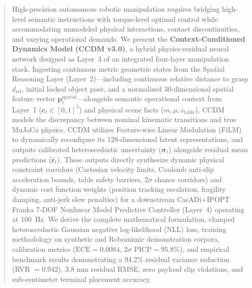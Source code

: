 \documentclass[10pt,a4paper]{article}
\begin{document}
\begin{abstract}
High-precision autonomous robotic manipulation requires bridging high-level semantic instructions with torque-level optimal control while accommodating unmodeled physical interactions, contact discontinuities, and varying operational demands. We present the \textbf{Context-Conditioned Dynamics Model (CCDM v3.0)}, a hybrid physics-residual neural network designed as Layer~3 of an integrated four-layer manipulation stack. Ingesting continuous metric geometric states from the Spatial Reasoning Layer (Layer~2)---including continuous relative distance to grasp $d_{\mathrm{rel}}$, initial locked object pose, and a normalized 30-dimensional spatial feature vector $\mathbf{p}_t^{\mathrm{spatial}}$---alongside semantic operational context from Layer~1 ($\mathbf{c}_t \in [0, 1]^5$) and physical scene facts ($m, \mu, z_{\mathrm{table}}$), CCDM models the discrepancy between nominal kinematic transitions and true MuJoCo physics. CCDM utilizes Feature-wise Linear Modulation (FiLM) to dynamically reconfigure its 128-dimensional latent representations, and outputs calibrated heteroscedastic uncertainty ($\bm{\sigma}_t$) alongside residual mean predictions ($\hat{\mathbf{r}}_t$). These outputs directly synthesize dynamic physical constraint corridors (Cartesian velocity limits, Coulomb anti-slip acceleration bounds, table safety barriers, $2\sigma$ chance corridors) and dynamic cost function weights (position tracking escalation, fragility damping, anti-jerk slew penalties) for a downstream CasADi+IPOPT Franka 7-DOF Nonlinear Model Predictive Controller (Layer~4) operating at 100~Hz. We derive the complete mathematical formulation, clamped heteroscedastic Gaussian negative log-likelihood (NLL) loss, training methodology on synthetic and Robomimic demonstration corpora, calibration metrics ($\mathrm{ECE} = 0.0084$, $2\sigma$ $\mathrm{PICP} = 95.8\%$), and empirical benchmark results demonstrating a 94.2\% residual variance reduction (RVR $= 0.942$), $3.8\text{ mm}$ residual RMSE, zero payload slip violations, and sub-centimeter terminal placement accuracy.
\end{abstract}

\vspace{0.4cm}
\tableofcontents
\newpage

\end{document}
